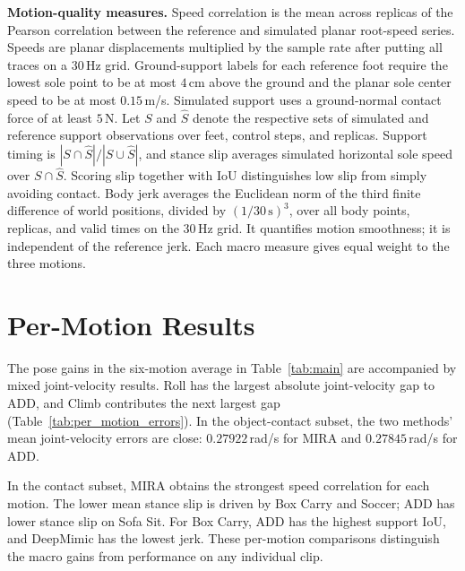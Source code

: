 \medskip
\noindent\textbf{Motion-quality measures.}
Speed correlation is the mean across replicas of the Pearson
correlation between the reference and simulated planar root-speed
series. Speeds are planar displacements multiplied by the sample
rate after putting all traces on a $30\,\mathrm{Hz}$ grid.
Ground-support labels for each reference foot require the lowest sole
point to be at most $4$\,cm above the ground and the planar sole
center speed to be at most $0.15$\,m/s. Simulated support uses a
ground-normal contact force of at least $5$\,N. Let $S$ and $\hat S$
denote the respective sets of simulated and reference support
observations over feet, control steps, and replicas. Support timing
is $|S\cap\hat S|/|S\cup\hat S|$, and stance slip averages simulated
horizontal sole speed over $S\cap\hat S$. Scoring slip together with
IoU distinguishes low slip from simply avoiding contact.
Body jerk averages the Euclidean norm of the third finite difference
of world positions, divided by $(1/30\,\mathrm{s})^3$, over all body
points, replicas, and valid times on the $30\,\mathrm{Hz}$ grid.
It quantifies motion smoothness; it is independent of the reference
jerk. Each macro measure gives equal weight to the three motions.

\clearpage
\section{Per-Motion Results}
\label{app:motion_results}
The pose gains in the six-motion average in Table~\ref{tab:main} are
accompanied by mixed joint-velocity results. Roll has the largest
absolute joint-velocity gap to ADD, and Climb contributes the next
largest gap (Table~\ref{tab:per_motion_errors}). In the object-contact
subset, the two methods' mean joint-velocity errors are close:
$0.27922$\,rad/s for MIRA and $0.27845$\,rad/s for ADD.





\noindent In the contact subset, MIRA obtains the strongest speed
correlation for each motion. The lower mean stance slip is driven by
Box Carry and Soccer; ADD has lower stance slip on Sofa Sit. For Box
Carry, ADD has the highest support IoU, and DeepMimic has the lowest
jerk. These per-motion comparisons distinguish the macro gains from
performance on any individual clip.

\clearpage
